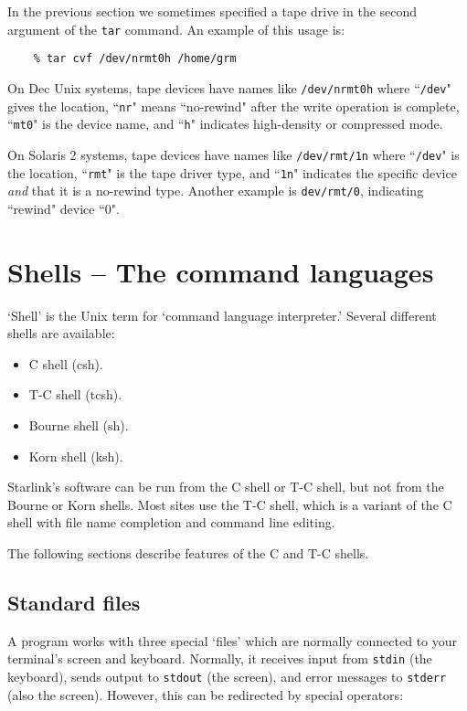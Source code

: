 In the previous section we sometimes specified a tape drive in the second
argument of the {\tt tar} command.
An example of this usage is:
\begin{verbatim}
    % tar cvf /dev/nrmt0h /home/grm
\end{verbatim}
On Dec Unix systems, tape devices have names like {\tt /dev/nrmt0h} where
``{\tt /dev}" gives the location,
``{\tt nr}" means ``no-rewind" after the write operation is complete,
``{\tt mt0}" is the device name, and
``{\tt h}" indicates high-density or compressed mode.

On Solaris 2 systems, tape devices have names like {\tt /dev/rmt/1n} where
``{\tt /dev}" is the location,
``{\tt rmt}" is the tape driver type, and
``{\tt 1n}" indicates the specific device {\em and}\/ that it is a
no-rewind type.
Another example is {\tt dev/rmt/0}, indicating ``rewind" device ``0".

\newpage

\section{Shells -- The command languages}

`Shell' is the Unix term for `command language interpreter.'
Several different shells are available:
\begin{itemize}
\item C shell (csh).
\item T-C shell (tcsh).
\item Bourne shell (sh).
\item Korn shell (ksh).
\end{itemize}
Starlink's software can be run from the C shell or T-C shell, but
not from the Bourne or Korn shells.
Most sites use the T-C shell, which is a variant of the C shell
with file name completion and command line editing.

The following sections describe features of the C and T-C shells.

\subsection{Standard files}

A program works with three special `files' which are normally connected to your
terminal's screen and keyboard.
Normally, it receives input from {\tt stdin} (the keyboard), sends output to
{\tt stdout} (the screen), and error messages to {\tt stderr} (also the screen).
However, this can be redirected by special operators:

